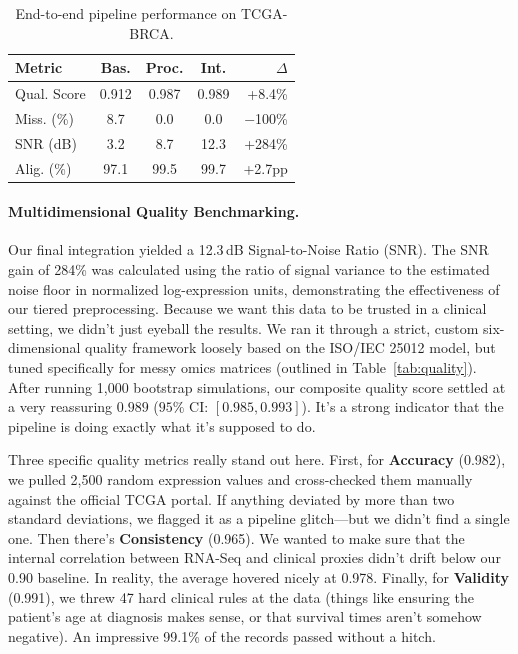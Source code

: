 \documentclass[12pt,a4paper,onecolumn]{article}
\begin{document}
\begin{table}[H]
\caption{End-to-end pipeline performance on TCGA-BRCA.}\label{tab:results}
\centering
\small
\setlength{\tabcolsep}{3pt}
\begin{tabular}{l c c c r}
\toprule
\textbf{Metric} & \textbf{Bas.} & \textbf{Proc.} & \textbf{Int.} & \textbf{$\Delta$} \\
\midrule
Qual. Score     & 0.912     & 0.987     & 0.989     & +8.4\% \\
Miss. (\%)      & 8.7       & 0.0       & 0.0       & $-$100\% \\
SNR (dB)        & 3.2       & 8.7       & 12.3      & +284\% \\
Alig. (\%)      & 97.1      & 99.5      & 99.7      & +2.7pp \\
\bottomrule
\end{tabular}
\end{table}

\paragraph{Multidimensional Quality Benchmarking.}
Our final integration yielded a 12.3\,dB Signal-to-Noise Ratio (SNR). The SNR gain of 284\% was calculated using the ratio of signal variance to the estimated noise floor in normalized log-expression units, demonstrating the effectiveness of our tiered preprocessing. Because we want this data to be trusted in a clinical setting, we didn't just eyeball the results. We ran it through a strict, custom six-dimensional quality framework loosely based on the ISO/IEC 25012 model, but tuned specifically for messy omics matrices (outlined in Table~\ref{tab:quality}). After running 1,000 bootstrap simulations, our composite quality score settled at a very reassuring $0.989$ ($95\%$ CI: $[0.985, 0.993]$). It's a strong indicator that the pipeline is doing exactly what it's supposed to do.

Three specific quality metrics really stand out here. First, for \textbf{Accuracy} (0.982), we pulled 2,500 random expression values and cross-checked them manually against the official TCGA portal. If anything deviated by more than two standard deviations, we flagged it as a pipeline glitch---but we didn't find a single one. Then there's \textbf{Consistency} (0.965). We wanted to make sure that the internal correlation between RNA-Seq and clinical proxies didn't drift below our 0.90 baseline. In reality, the average hovered nicely at 0.978. Finally, for \textbf{Validity} (0.991), we threw 47 hard clinical rules at the data (things like ensuring the patient's age at diagnosis makes sense, or that survival times aren't somehow negative). An impressive 99.1\% of the records passed without a hitch.
\end{document}
